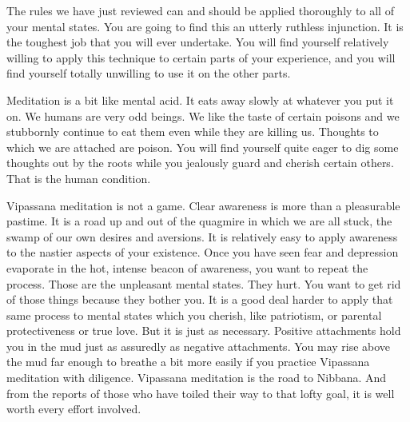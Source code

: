 The rules we have just reviewed can and should be applied thoroughly to all of
your mental states. You are going to find this an utterly ruthless injunction.
It is the toughest job that you will ever undertake. You will find yourself
relatively willing to apply this technique to certain parts of your experience,
and you will find yourself totally unwilling to use it on the other parts.

Meditation is a bit like mental acid. It eats away slowly at whatever you put it
on. We humans are very odd beings. We like the taste of certain poisons and we
stubbornly continue to eat them even while they are killing us. Thoughts to
which we are attached are poison. You will find yourself quite eager to dig some
thoughts out by the roots while you jealously guard and cherish certain others.
That is the human condition.

Vipassana meditation is not a game. Clear awareness is more than a pleasurable
pastime. It is a road up and out of the quagmire in which we are all stuck, the
swamp of our own desires and aversions. It is relatively easy to apply awareness
to the nastier aspects of your existence. Once you have seen fear and depression
evaporate in the hot, intense beacon of awareness, you want to repeat the
process. Those are the unpleasant mental states. They hurt. You want to get rid
of those things because they bother you. It is a good deal harder to apply that
same process to mental states which you cherish, like patriotism, or parental
protectiveness or true love. But it is just as necessary. Positive attachments
hold you in the mud just as assuredly as negative attachments. You may rise
above the mud far enough to breathe a bit more easily if you practice Vipassana
meditation with diligence. Vipassana meditation is the road to Nibbana. And from
the reports of those who have toiled their way to that lofty goal, it is well
worth every effort involved.